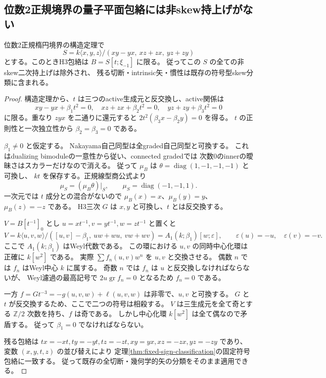 \subsection{位数2正規境界の量子平面包絡には非skew持上げがない}
\label{subsec:normal-order2-quantum}
\begin{theorem}[involution型量子平面の定数変形の除外]
\label{thm:normal-order2-quantum-rigid}
位数2正規楕円境界の構造定理で
\[
 S=k\langle x,y,z\rangle/(xy-yx,\ xz+zx,\ yz+zy)
\]
とする。このときH3包絡は $B=S[t;\xi_{-1}]$ に限る。
従ってこの $S$ の全ての非skew二次持上げは除外され、
残る切断・intrinsic矢・慣性は既存の符号型skew分類に含まれる。
\end{theorem}
\begin{proof}
構造定理から、$t$ は三つのactive生成元と反交換し、active関係は
\[
 xy-yx+\beta_1t^2=0,\quad
 xz+zx+\beta_2t^2=0,\quad
 yz+zy+\beta_3t^2=0
\]
に限る。重なり $zyx$ を二通りに還元すると
$2t^2(\beta_3x-\beta_2y)=0$ を得る。
$t$ の正則性と一次独立性から $\beta_2=\beta_3=0$ である。

$\beta_1\ne0$ と仮定する。
Nakayama自己同型は全graded自己同型と可換する。
これはdualizing bimoduleの一意性から従い、connected gradedでは
次数0のinnerの曖昧さはスカラーだけなので消える。
従って $\mu_B$ は $\theta=\operatorname{diag}(1,-1,-1,-1)$ と可換し、
$kt$ を保存する。正規線型商公式より
\[
 \mu_S=(\mu_B\theta)|_S,
 \qquad \mu_S=\operatorname{diag}(-1,-1,1).
\]
一次元では $t$ 成分との混合がないので
$\mu_B(x)=x$、$\mu_B(y)=y$、$\mu_B(z)=-z$ である。
H3三次 $G$ は $x,y$ と可換し、$t$ とは反交換する。

$V=B[t^{-1}]_0$ とし $u=xt^{-1},v=yt^{-1},w=zt^{-1}$ と置くと
\[
 V=k\langle u,v,w\rangle/([u,v]-\beta_1,\ uw+wu,\ vw+wv)
   =A_1(k;\beta_1)[w;\varepsilon],
 \qquad \varepsilon(u)=-u,\quad\varepsilon(v)=-v.
\]
ここで $A_1(k;\beta_1)$ はWeyl代数である。
この環における $u,v$ の同時中心化環は正確に $k[w^2]$ である。
実際 $\sum f_n(u,v)w^n$ を $u,v$ と交換させる。
偶数 $n$ では $f_n$ はWeyl中心 $k$ に属する。
奇数 $n$ では $f_n$ は $u$ と反交換しなければならないが、
Weyl濾過の最高記号で $2u\operatorname{gr}f_n=0$ となるため $f_n=0$ である。

一方 $f=Gt^{-3}= -g(u,v,w)+\ell(u,v,w)$ は非零で、$u,v$ と可換する。
$G$ と $t$ が反交換するため、ここで二つの符号は相殺する。
$V$ は三生成元を全て奇とする $\mathbb Z/2$ 次数を持ち、$f$ は奇である。
しかし中心化環 $k[w^2]$ は全て偶なので矛盾する。
従って $\beta_1=0$ でなければならない。

残る包絡は $tx=-xt,ty=-yt,tz=-zt,xy=yx,xz=-zx,yz=-zy$ であり、
変数 $(x,y,t,z)$ の並び替えにより
定理\ref{thm:fixed-sign-classification}の固定符号包絡に一致する。
従って既存の全切断・幾何学的矢の分類をそのまま適用できる。
\end{proof}
